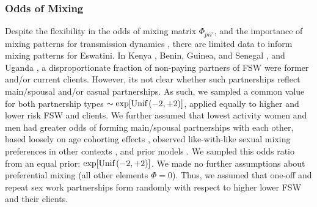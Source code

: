 \subsubsection{Odds of Mixing}\label{mod.par.mix.odds}
Despite the flexibility in the odds of mixing matrix $\Phi_{pii'}$,
and the importance of mixing patterns for transmission dynamics \cite{Garnett1993hiv},
there are limited data to inform mixing patterns for Eswatini.
In Kenya \cite{Voeten2007}, Benin, Guinea, and Senegal \cite{Godin2008}, and Uganda \cite{Mbonye2022},
a disproportionate fraction of non-paying partners of FSW were former and/or current clients.
However, its not clear whether such partnerships reflect main/spousal and/or casual partnerships.
As such, we sampled a common value for both partnership types
$\sim \exp[\textnormal{Unif}\,(-2,+2)]$,
applied equally to higher and lower risk FSW and clients.
We further assumed that lowest activity women and men had
greater odds of forming main/spousal partnerships with each other,
based loosely on age cohorting effects \cite{Leclerc-Madlala2008},
observed like-with-like sexual mixing preferences in other contexts
\cite{Morris1991ll,Garnett1993gon,Admiraal2016},
and prior models \cite{Knight2022sr}.
We sampled this odds ratio from an equal prior: $\exp[\textnormal{Unif}\,(-2,+2)]$.
We made no further assumptions about preferential mixing (\ie all other elements $\Phi = 0$).
Thus, we assumed that one-off and repeat sex work partnerships form
randomly with respect to higher \vs lower FSW and their clients.
